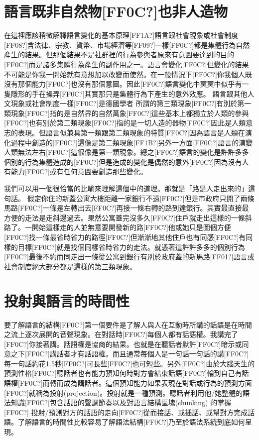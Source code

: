 \section{語言既非自然物[FF0C?]也非人造物} %

在這裡應該稍微解釋語言變化的基本原理[FF1A?]語言跟社會現象或社會制度[FF08?]含法律、宗教、貨幣、市場經濟等[FF09?]一樣[FF0C?]都是集體行為自然產生的結果。但那個結果不是社群裡的行為參與者原來有意圖要達到的目的[FF0C?]而是諸多集體行為產生的副作用之一。語言會變化[FF0C?]但變化的結果不可能是你我一開始就有意想加以改變而使然。在一般情況下[FF0C?]你我個人既沒有那個能力[FF0C?]也沒有那個意圖。因此[FF0C?]語言變化中冥冥中似乎有一隻隱形的手在操弄[FF0C?]其實那只是集體行為下產生的意外效應。 語言跟其他人文現象或社會制度一樣[FF0C?]是德國學者\citet{Keller1994} 所謂的第三類現象[FF0C?]有別於第一類現象[FF0C?]指的是自然界的自然萬象[FF0C?]這些基本上都獨立於人類的參與[FF0C?]也有別於第二類現象[FF0C?]指的是一切人造的器物[FF0C?]因此是人類意志的表現。但語言似兼具第一類跟第二類現象的特質[FF0C?]因為語言是人類在演化過程中創造的[FF0C?]這像是第二類現象[FF1B?]另外一方面[FF0C?]語言的演變人類無法左右[FF0C?]這很像是第一類現象。總之[FF0C?]語言的變化是許許多多個別的行為集體造成的[FF0C?]但是造成的變化是偶然的意外[FF0C?]因為沒有人有能力[FF0C?]或有任何意圖要創造那些變化。     

我們可以用一個很恰當的比喻來理解這個中的道理。那就是「路是人走出來的」這句話。 假定你住的新蓋公寓大樓距離一家銀行不遠[FF0C?]但是市政府只開了兩條馬路[FF0C?]一條是左轉出去[FF0C?]再接一條右轉的路到達銀行。其實最直接最方便的走法是走斜邊過去。果然公寓蓋完沒多久[FF0C?]住戶就走出這樣的一條斜路了。一開始這樣走的人並無意要開發新的路[FF0C?]他或她只是圖個方便[FF0C?]找一條最省時省力的路徑[FF0C?]但漸漸地其他住戶也有同感[FF0C?]有同樣的目標[FF0C?]就是找個同樣省時省力的走法。就憑著這許許多多的個別行為[FF0C?]最後不約而同走出一條從公寓到銀行有別於政府蓋的新馬路[FF01?]語言或社會制度絕大部分都是這樣的第三類現象。

\section{投射與語言的時間性} %

要了解語言的結構[FF0C?]第一個要件是了解人與人在互動時所講的話語是在時間之流上逐次展開的音聲現象。在對話時[FF0C?]每個人都有話語權。我講完了[FF0C?]你接著講。話語權是協商的結果。也就是在聽話者默許[FF0C?]暗示或同意之下[FF0C?]講話者才有話語權。而且通常每個人是一句話一句話的講[FF0C?]每一句話約花1.5秒[FF0C?]可長些[FF0C?]也可短些。另外[FF0C?]由於大腦天生的預測性格[FF0C?]聽話者也有能力預知何時對方會結束話語[FF0C?]輪到自己有話語權[FF0C?]而轉而成為講話者。這個預知能力如果表現在對話或行為的預測方面[FF0C?]就稱為投射(projection)。投射就是一種預測。聽話者利用他/她整體的語法知識[FF0C?]包含話語的聲調節奏以及對語言結構區塊(chunking) 的掌握[FF0C?] 投射/預測對方的話語的走向[FF0C?]從而接話、或插話、或幫對方完成話語。了解語言的時間性比較容易了解語法結構[FF0C?]乃至於語法系統到底如何呈現。

